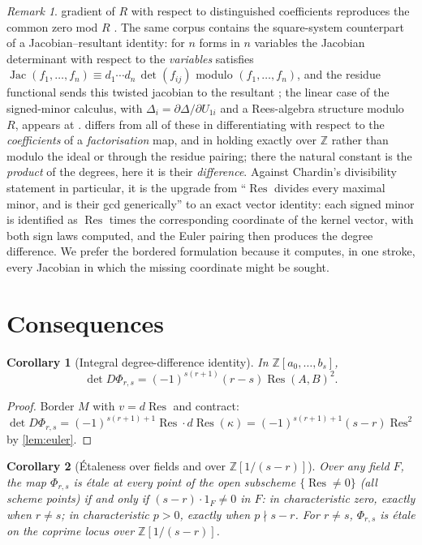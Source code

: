 \documentclass[11pt,reqno]{amsart}
\newtheorem{corollary}[corollary]{Corollary}
\theoremstyle{definition}
\theoremstyle{remark}
\newtheorem{remark}[remark]{Remark}
\newcommand{\Z}{\mathbb Z}
\newcommand{\Res}{\operatorname{Res}}
\begin{document}
\begin{remark}
gradient of $R$ with respect to distinguished coefficients
reproduces the common zero mod $R$
\cite[3.10.15, 3.10.25--3.10.31, 3.11.19.23--3.11.19.31]{JouanolouFormulaire}.
The same corpus contains the square-system counterpart of a
Jacobian--resultant identity: for $n$ forms in $n$ variables the
Jacobian determinant with respect to the \emph{variables} satisfies
$\operatorname{Jac}(f_1,\dots,f_n)\equiv
d_1\cdots d_n\,\det(f_{ij})$ modulo $(f_1,\dots,f_n)$, and the
residue functional sends this twisted jacobian to the resultant
\cite[3.8.1.9, 3.8.2.9]{JouanolouAspects}; the linear case of the
signed-minor calculus, with $\Delta_i=\partial\Delta/\partial
U_{1i}$ and a Rees-algebra structure modulo $R$, appears at
\cite[3.5.5]{JouanolouAspects}.   differs from
all of these in differentiating with respect to the
\emph{coefficients} of a \emph{factorisation} map, and in holding
exactly over $\Z$ rather than modulo the ideal or through the
residue pairing; there the natural constant is the \emph{product}
of the degrees, here it is their \emph{difference}.  Against
Chardin's divisibility statement in particular, it is the upgrade
from ``$\Res$ divides every maximal minor, and is their gcd
generically'' to an exact vector identity: each signed minor is
identified as $\Res$ times the corresponding coordinate of the
kernel vector, with both sign laws computed, and the Euler pairing
then produces the degree difference.  We prefer the bordered formulation because it
computes, in one stroke, every Jacobian in which the missing
coordinate might be sought.
\end{remark}

\section{Consequences}\label{sec:consequences}

\begin{corollary}[Integral degree-difference identity]
\label{cor:integral-dd}
In $\Z[a_0,\dots,b_s]$,
\[
 \det D\Phi_{r,s}=(-1)^{s(r+1)}(r-s)\Res(A,B)^2 .
\]
\end{corollary}

\begin{proof}
Border $M$ with $v=d\Res$ and contract:
$\det D\Phi_{r,s}=(-1)^{s(r+1)+1}\Res\cdot d\Res(\kappa)
=(-1)^{s(r+1)+1}(s-r)\Res^2$ by \cref{lem:euler}.
\end{proof}

\begin{corollary}[{\'Etaleness over fields and over $\Z[1/(s-r)]$}]\label{cor:char-p}
Over any field $F$, the map $\Phi_{r,s}$ is \'etale at every point
of the open subscheme $\{\Res\ne0\}$ (all scheme points) if and
only if
$(s-r)\cdot1_F\ne0$ in $F$: in characteristic zero, exactly when
$r\ne s$; in characteristic $p>0$, exactly when
$p\nmid s-r$.  For $r\ne s$, $\Phi_{r,s}$ is \'etale on the coprime
locus over $\Z[1/(s-r)]$.
\end{corollary}
\end{document}
